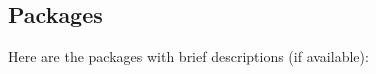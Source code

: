 \subsection{Packages}
Here are the packages with brief descriptions (if available)\+:\begin{DoxyCompactList}
\item{}
\end{DoxyCompactList}
